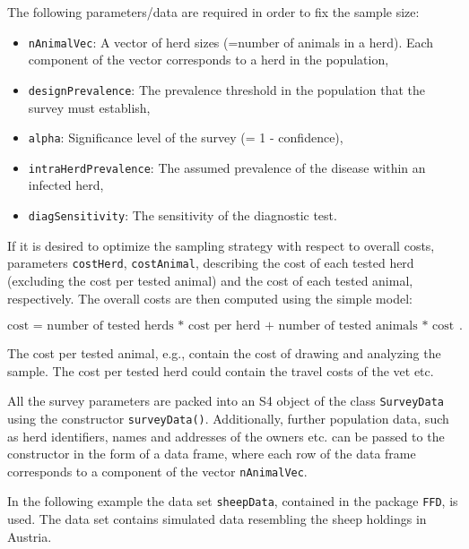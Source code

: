\documentclass[nojss]{jss}
\begin{document}
The following parameters/data are required in order to fix the 
sample size: 

\begin{itemize} 
% 
\item \texttt{nAnimalVec}: A vector of herd sizes (=number of
animals in a herd). Each component of the vector corresponds to a herd 
in the population,
\item \texttt{designPrevalence}: The prevalence threshold in the population
that the survey must establish,
\item \texttt{alpha}: Significance level of the survey (= 1 - confidence),
\item \texttt{intraHerdPrevalence}: The assumed prevalence of the 
disease within an infected herd,
\item \texttt{diagSensitivity}: The sensitivity of the diagnostic test.
%
\end{itemize} 

If it is desired to optimize the sampling strategy with respect to 
overall costs, parameters \texttt{costHerd}, \texttt{costAnimal}, 
describing the cost of each tested herd (excluding the cost per 
tested animal) and the cost of each tested animal, respectively. The 
overall costs are then computed using the simple model:

$$\mbox{cost = number of tested herds * cost per herd + number of 
tested animals * cost per animal}.$$ 
 
The cost per tested animal, e.g., contain the cost of drawing and 
analyzing the sample. The cost per tested herd could contain the 
travel costs of the vet etc.

All the survey parameters are packed into an S4 object of the class 
\texttt{SurveyData}  
  using the constructor 
\texttt{surveyData()}.  Additionally, 
further population data, such as herd identifiers, names and 
addresses of the owners etc. can be passed to the constructor in the 
form of a data frame, where each row of the data frame corresponds 
to a component of the vector \texttt{nAnimalVec}. 

In the following example the data set \texttt{sheepData}, contained 
in the package \texttt{FFD}, is used. The data set contains 
simulated data resembling the sheep holdings in Austria. 

 
\end{document}
